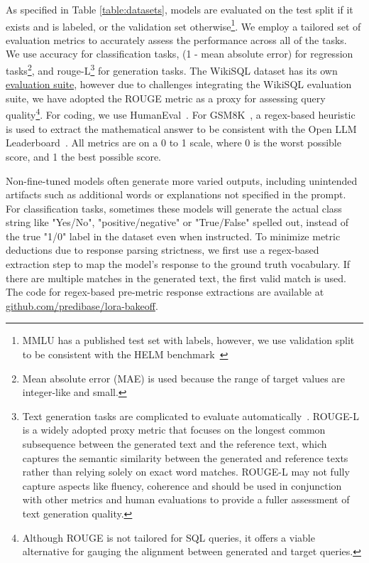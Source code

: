As specified in Table \ref{table:datasets}, models are evaluated on the test split if it exists and is labeled, or the validation set otherwise\footnote{MMLU has a published test set with labels, however, we use validation split to be consistent with the HELM benchmark~\cite{liang2023helm}}. We employ a tailored set of evaluation metrics to accurately assess the performance across all of the tasks. We use accuracy for classification tasks, (1 - mean absolute error) for regression tasks\footnote{Mean absolute error (MAE) is used because the range of target values are integer-like and small.}, and rouge-L\footnote{Text generation tasks are complicated to evaluate automatically~\cite{53kocmi2021nmteval}. ROUGE-L is a widely adopted proxy metric that focuses on the longest common subsequence between the generated text and the reference text, which captures the semantic similarity between the generated and reference texts rather than relying solely on exact word matches. ROUGE-L may not fully capture aspects like fluency, coherence and should be used in conjunction with other metrics and human evaluations to provide a fuller assessment of text generation quality.} for generation tasks. The WikiSQL dataset has its own \href{https://github.com/salesforce/WikiSQL/tree/master}{evaluation suite}, however due to challenges integrating the WikiSQL evaluation suite, we have adopted the ROUGE metric as a proxy for assessing query quality\footnote{Although ROUGE is not tailored for SQL queries, it offers a viable alternative for gauging the alignment between generated and target queries.}. For coding, we use HumanEval~\cite{59chen2021codex}. For GSM8K~\cite{gsm8k}, a regex-based heuristic~\cite{47eval-harness} is used to extract the mathematical answer to be consistent with the Open LLM Leaderboard~\cite{34open-llm-leaderboard}. All metrics are on a 0 to 1 scale, where 0 is the worst possible score, and 1 the best possible score.

Non-fine-tuned models often generate more varied outputs, including unintended artifacts such as additional words or explanations not specified in the prompt. For classification tasks, sometimes these models will generate the actual class string like "Yes/No", "positive/negative" or "True/False" spelled out, instead of the true "1/0" label in the dataset even when instructed. To minimize metric deductions due to response parsing strictness, we first use a regex-based extraction step to map the model’s response to the ground truth vocabulary. If there are multiple matches in the generated text, the first valid match is used. The code for regex-based pre-metric response extractions are available at \href{https://www.github.com/predibase/lora-bakeoff}{github.com/predibase/lora-bakeoff}.

